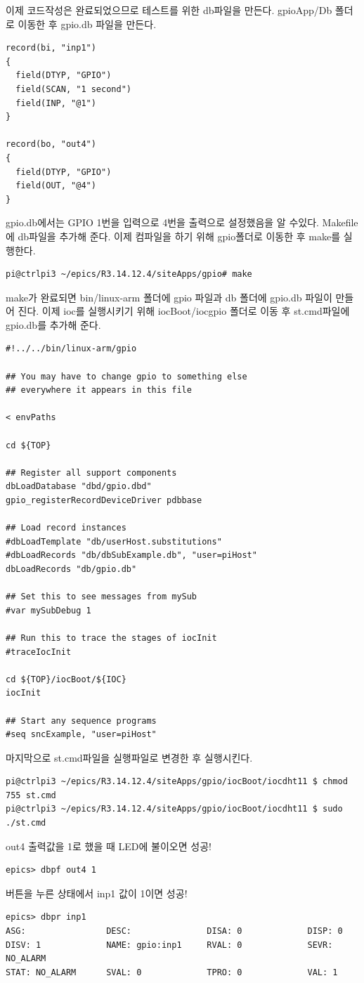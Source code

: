 \documentclass[11pt
  , a4paper
  , article
  , oneside
]{memoir}
\begin{document}
 이제 코드작성은 완료되었으므로 테스트를 위한 db파일을 만든다. gpioApp/Db 폴더로 이동한 후 gpio.db 
파일을 만든다. 
\begin{lstlisting}[style=termstyle]
record(bi, "inp1")
{
  field(DTYP, "GPIO")
  field(SCAN, "1 second")
  field(INP, "@1")
}

record(bo, "out4")
{
  field(DTYP, "GPIO")
  field(OUT, "@4")
}
\end{lstlisting}
gpio.db에서는 GPIO 1번을 입력으로 4번을 출력으로 설정했음을 알 수있다. Makefile에 db파일을 추가해 준다.
이제 컴파일을 하기 위해 gpio폴더로 이동한 후 make를 실행한다.
\begin{lstlisting}[style=termstyle]
pi@ctrlpi3 ~/epics/R3.14.12.4/siteApps/gpio# make
\end{lstlisting}
make가 완료되면 bin/linux-arm 폴더에 gpio 파일과 db 폴더에 gpio.db 파일이 만들어 진다.
이제 ioc를 실행시키기 위해 iocBoot/iocgpio 폴더로 이동 후 st.cmd파일에 gpio.db를 추가해 준다.
\begin{lstlisting}[style=termstyle]
#!../../bin/linux-arm/gpio

## You may have to change gpio to something else
## everywhere it appears in this file

< envPaths

cd ${TOP}

## Register all support components
dbLoadDatabase "dbd/gpio.dbd"
gpio_registerRecordDeviceDriver pdbbase

## Load record instances
#dbLoadTemplate "db/userHost.substitutions"
#dbLoadRecords "db/dbSubExample.db", "user=piHost"
dbLoadRecords "db/gpio.db"

## Set this to see messages from mySub
#var mySubDebug 1

## Run this to trace the stages of iocInit
#traceIocInit

cd ${TOP}/iocBoot/${IOC}
iocInit

## Start any sequence programs
#seq sncExample, "user=piHost"
\end{lstlisting}
마지막으로 st.cmd파일을 실행파일로 변경한 후 실행시킨다.
\begin{lstlisting}[style=termstyle]
pi@ctrlpi3 ~/epics/R3.14.12.4/siteApps/gpio/iocBoot/iocdht11 $ chmod 755 st.cmd
pi@ctrlpi3 ~/epics/R3.14.12.4/siteApps/gpio/iocBoot/iocdht11 $ sudo ./st.cmd
\end{lstlisting}
out4 출력값을 1로 했을 때 LED에 불이오면 성공!
\begin{lstlisting}[style=termstyle]
epics> dbpf out4 1
\end{lstlisting}
버튼을 누른 상태에서 inp1 값이 1이면 성공!
\begin{lstlisting}[style=termstyle]
epics> dbpr inp1
ASG:                DESC:               DISA: 0             DISP: 0             
DISV: 1             NAME: gpio:inp1     RVAL: 0             SEVR: NO_ALARM      
STAT: NO_ALARM      SVAL: 0             TPRO: 0             VAL: 1
\end{lstlisting}
\end{document}
